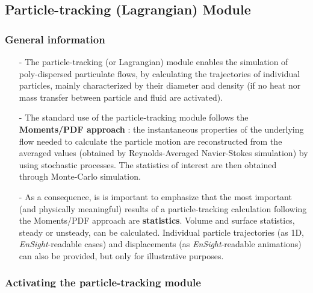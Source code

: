 {{%
\subsection{Particle-tracking (Lagrangian) Module}

\subsubsection{General information}\label{sec:over-lag}

\begin{itemize} 

\item[-] The particle-tracking (or Lagrangian) module enables the simulation of poly-dispersed particulate flows, by calculating the trajectories of individual particles, mainly characterized by their diameter and density (if no heat nor mass transfer between particle and fluid are activated). 

\item[-] The standard use of the particle-tracking module follows the \textbf{Moments/PDF approach} : the instantaneous properties of the underlying flow needed to calculate the particle motion are reconstructed from the averaged values (obtained by Reynolds-Averaged Navier-Stokes simulation) by using stochastic processes. The statistics of interest are then obtained through Monte-Carlo simulation.

\item[-] As a consequence, is is important to emphasize that the most important (and physically meaningful) results of a particle-tracking calculation following the Moments/PDF approach are \mbox{\textbf{statistics}}. Volume and surface statistics, steady or unsteady, can be calculated. Individual particle trajectories (as 1D, \textit{EnSight}-readable cases) and displacements (as \textit{EnSight}-readable animations) can also be provided, but only for illustrative purposes.   

\end{itemize}

\subsubsection{Activating the particle-tracking module}\label{sec:acti-lag}

}}
